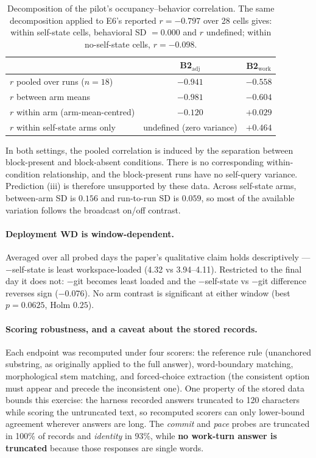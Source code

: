 \documentclass{article}
\begin{document}
\begin{table}[h]
\centering\small
\begin{tabular}{lcc}
\toprule
& B2$_{\mathrm{adj}}$ & B2$_{\mathrm{work}}$ \\
\midrule
$r$ pooled over runs ($n=18$) & $-0.941$ & $-0.558$ \\
$r$ between arm means & $-0.981$ & $-0.604$ \\
$r$ within arm (arm-mean-centred) & $-0.120$ & $+0.029$ \\
$r$ within self-state arms only & undefined (zero variance) & $+0.464$ \\
\bottomrule
\end{tabular}
\caption{Decomposition of the pilot's occupancy--behavior correlation. The same decomposition applied to E6's reported $r=-0.797$ over 28 cells gives: within self-state cells, behavioral SD $=0.000$ and $r$ undefined; within no-self-state cells, $r=-0.098$.}
\label{tab:corr}
\end{table}

In both settings, the pooled correlation is induced by the separation between block-present and block-absent conditions. There is no corresponding within-condition relationship, and the block-present runs have no self-query variance. Prediction (iii) is therefore unsupported by these data. Across self-state arms, between-arm SD is $0.156$ and run-to-run SD is $0.059$, so most of the available variation follows the broadcast on/off contrast.

\paragraph{Deployment WD is window-dependent.} Averaged over all probed days the paper's qualitative claim holds descriptively --- $-$self-state is least workspace-loaded (4.32 vs 3.94--4.11). Restricted to the final day it does not: $-$git becomes least loaded and the $-$self-state vs $-$git difference reverses sign ($-0.076$). No arm contrast is significant at either window (best $p=0.0625$, Holm $0.25$).

\paragraph{Scoring robustness, and a caveat about the stored records.} Each endpoint was recomputed under four scorers: the reference rule (unanchored substring, as originally applied to the full answer), word-boundary matching, morphological stem matching, and forced-choice extraction (the consistent option must appear and precede the inconsistent one). One property of the stored data bounds this exercise: the harness recorded answers truncated to 120 characters while scoring the untruncated text, so recomputed scorers can only lower-bound agreement wherever answers are long. The \emph{commit} and \emph{pace} probes are truncated in 100\% of records and \emph{identity} in 93\%, while \textbf{no work-turn answer is truncated} because those responses are single words.
\end{document}
